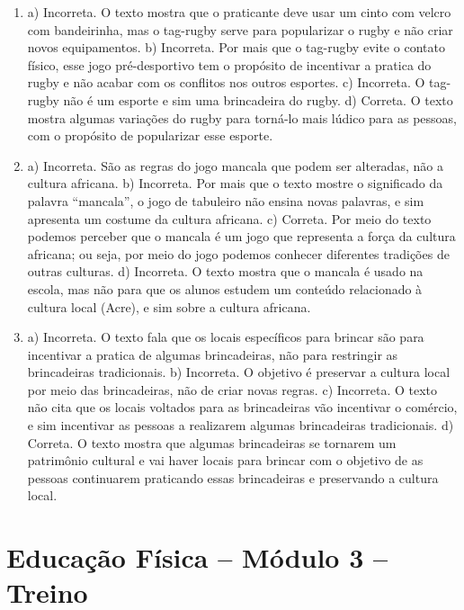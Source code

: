 \begin{enumerate}
\item
a) Incorreta. O texto mostra que o praticante deve usar um cinto com
velcro com bandeirinha, mas o tag-rugby serve para popularizar o rugby e
não criar novos equipamentos.
b) Incorreta. Por mais que o tag-rugby evite o contato físico, esse jogo
pré-desportivo tem o propósito de incentivar a pratica do rugby e não
acabar com os conflitos nos outros esportes.
c) Incorreta. O tag-rugby não é um esporte e sim uma brincadeira do
rugby.
d) Correta. O texto mostra algumas variações do rugby para torná-lo mais
lúdico para as pessoas, com o propósito de popularizar esse esporte.

\item
a) Incorreta. São as regras do jogo mancala que podem ser
alteradas, não a cultura africana.
b) Incorreta. Por mais que o texto mostre o significado da palavra
“mancala”, o jogo de tabuleiro não ensina novas palavras, e sim
apresenta um costume da cultura africana.
c) Correta. Por meio do texto podemos perceber que o mancala é um jogo
que representa a força da cultura africana; ou seja, por meio do jogo podemos conhecer diferentes tradições de outras culturas.
d) Incorreta. O texto mostra que o mancala é usado na escola, mas não
para que os alunos estudem um conteúdo relacionado à cultura local
(Acre), e sim sobre a cultura africana.

\item
a) Incorreta. O texto fala que os locais específicos para brincar são para
incentivar a pratica de algumas brincadeiras, não para restringir as
brincadeiras tradicionais.
b) Incorreta. O objetivo é preservar a cultura local por meio das
brincadeiras, não de criar novas regras.
c) Incorreta. O texto não cita que os locais voltados para as
brincadeiras vão incentivar o comércio, e sim incentivar as pessoas a
realizarem algumas brincadeiras tradicionais.
d) Correta. O texto mostra que algumas brincadeiras se tornarem um
patrimônio cultural e vai haver locais para brincar com o objetivo de
as pessoas continuarem praticando essas brincadeiras e preservando a cultura
local.
\end{enumerate}

\section*{Educação Física -- Módulo 3 -- Treino}

